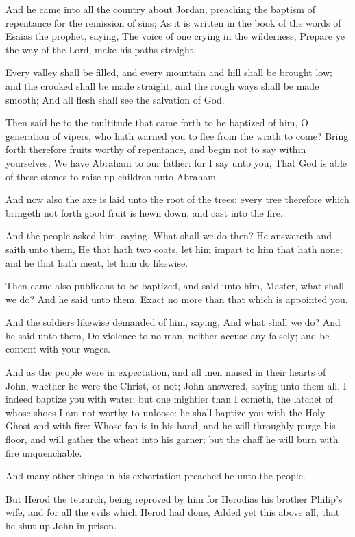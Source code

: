 \Verse And he came into all the country about Jordan, preaching the baptism of repentance for the remission of sins; \Verse As it is written in the book of the words of Esaias the prophet, saying, The voice of one crying in the wilderness, Prepare ye the way of the Lord, make his paths straight.

\Verse Every valley shall be filled, and every mountain and hill shall be brought low; and the crooked shall be made straight, and the rough ways shall be made smooth; \Verse And all flesh shall see the salvation of God.

\Verse Then said he to the multitude that came forth to be baptized of him, O generation of vipers, who hath warned you to flee from the wrath to come?  \Verse Bring forth therefore fruits worthy of repentance, and begin not to say within yourselves, We have Abraham to our father: for I say unto you, That God is able of these stones to raise up children unto Abraham.

\Verse And now also the axe is laid unto the root of the trees: every tree therefore which bringeth not forth good fruit is hewn down, and cast into the fire.

\Verse And the people asked him, saying, What shall we do then?  \Verse He answereth and saith unto them, He that hath two coats, let him impart to him that hath none; and he that hath meat, let him do likewise.

\Verse Then came also publicans to be baptized, and said unto him, Master, what shall we do?  \Verse And he said unto them, Exact no more than that which is appointed you.

\Verse And the soldiers likewise demanded of him, saying, And what shall we do? And he said unto them, Do violence to no man, neither accuse any falsely; and be content with your wages.

\Verse And as the people were in expectation, and all men mused in their hearts of John, whether he were the Christ, or not; \Verse John answered, saying unto them all, I indeed baptize you with water; but one mightier than I cometh, the latchet of whose shoes I am not worthy to unloose: he shall baptize you with the Holy Ghost and with fire: \Verse Whose fan is in his hand, and he will throughly purge his floor, and will gather the wheat into his garner; but the chaff he will burn with fire unquenchable.

\Verse And many other things in his exhortation preached he unto the people.

\Verse But Herod the tetrarch, being reproved by him for Herodias his brother Philip's wife, and for all the evils which Herod had done, \Verse Added yet this above all, that he shut up John in prison.

